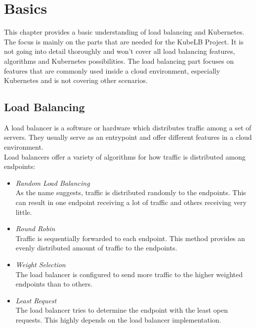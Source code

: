 \chapter{Basics}\label{basics}

This chapter provides a basic understanding of load balancing and Kubernetes.
The focus is mainly on the parts that are needed for the KubeLB Project.
It is not going into detail thoroughly and won't cover all load balancing features, algorithms and Kubernetes possibilities.
The load balancing part focuses on features that are commonly used inside a cloud environment, especially Kubernetes and is not covering other scenarios.

\section{Load Balancing}

A load balancer is a software or hardware which distributes traffic among a set of servers.
They usually serve as an entrypoint and offer different features in a cloud environment.
\\
Load balancers offer a variety of algorithms for how traffic is distributed among endpoints:

\begin{itemize}\label{item:lb-algorithms}
    \item \textit{Random Load Balancing} \\
    As the name suggests, traffic is distributed randomly to the endpoints.
    This can result in one endpoint receiving a lot of traffic and others receiving very little.
    \item \textit{Round Robin} \\
    Traffic is sequentially forwarded to each endpoint.
    This method provides an evenly distributed amount of traffic to the endpoints.
    \item \textit{Weight Selection} \\
    The load balancer is configured to send more traffic to the higher weighted endpoints than to others.
    \item \textit{Least Request} \\
    The load balancer tries to determine the endpoint with the least open requests.
    This highly depends on the load balancer implementation.
\end{itemize}

